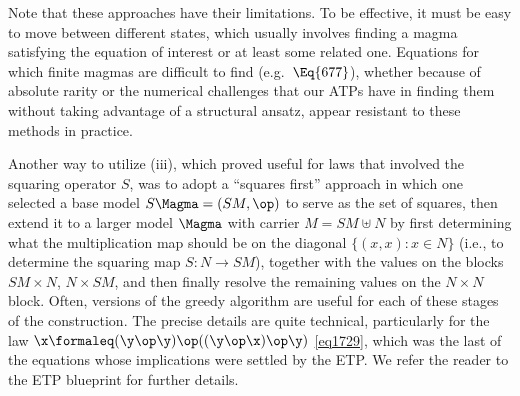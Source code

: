 Note that these approaches have their limitations.  To be effective, it must be easy to move between different
states, which usually involves finding a magma satisfying the equation of interest or at least some related one.
Equations for which finite magmas are difficult to find (e.g.\ $\Eq{677}$), whether because of absolute rarity or the numerical challenges
that our ATPs have in finding them without taking advantage of a structural ansatz, appear resistant to these methods in practice.

Another way to utilize (iii), which proved useful for laws that involved the squaring operator $S$, was to adopt a ``squares first'' approach in which one selected a base model $S\Magma = (SM,\op)$ to serve as the set of squares, then extend it to a larger model $\Magma$ with carrier $M = SM \uplus N$ by first determining what the multiplication map should be on the diagonal $\{ (x,x): x\in N\}$ (i.e., to determine the squaring map $S \colon N \to SM$), together with the values on the blocks $SM \times N$, $N \times SM$, and then finally resolve the remaining values on the $N \times N$ block.  Often, versions of the greedy algorithm are useful for each of these stages of the construction.  The precise details are quite technical, particularly for the law $\x \formaleq (\y \op \y) \op ((\y \op \x) \op \y)$ \eqref{eq1729}, which was the last of the equations whose implications were settled by the ETP.  We refer the reader to the ETP blueprint for further details.
